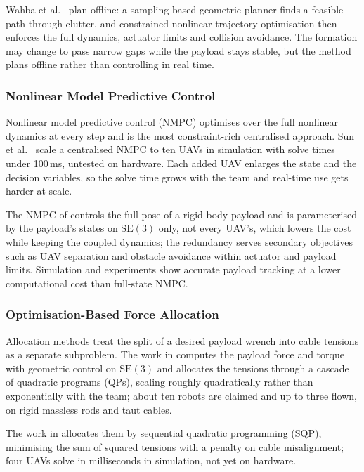 Wahba et al.\ \cite{wahbaKinodynamicMotionPlanning2024} plan offline: a sampling-based geometric planner finds a feasible path through clutter, and constrained nonlinear trajectory optimisation then enforces the full dynamics, actuator limits and collision avoidance. The formation may change to pass narrow gaps while the payload stays stable, but the method plans offline rather than controlling in real time.

\subsubsection{Nonlinear Model Predictive Control}

Nonlinear model predictive control (NMPC) optimises over the full nonlinear dynamics at every step and is the most constraint-rich centralised approach. Sun et al.\ \cite{sunNonlinearMPCFullPose2023} scale a centralised NMPC to ten UAVs in simulation with solve times under 100\,ms, untested on hardware. Each added UAV enlarges the state and the decision variables, so the solve time grows with the team and real-time use gets harder at scale.

The NMPC of \cite{liNonlinearModelPredictive2023} controls the full pose of a rigid-body payload and is parameterised by the payload's states on $\mathrm{SE}(3)$ only, not every UAV's, which lowers the cost while keeping the coupled dynamics; the redundancy serves secondary objectives such as UAV separation and obstacle avoidance within actuator and payload limits. Simulation and experiments show accurate payload tracking at a lower computational cost than full-state NMPC.

\subsubsection{Optimisation-Based Force Allocation}

Allocation methods treat the split of a desired payload wrench into cable tensions as a separate subproblem. The work in \cite{efficient} computes the payload force and torque with geometric control on $\text{SE}(3)$ and allocates the tensions through a cascade of quadratic programs (QPs), scaling roughly quadratically rather than exponentially with the team; about ten robots are claimed and up to three flown, on rigid massless rods and taut cables.

The work in \cite{vazquez-soquiSQPBasedCableTensionAllocation2026} allocates them by sequential quadratic programming (SQP), minimising the sum of squared tensions with a penalty on cable misalignment; four UAVs solve in milliseconds in simulation, not yet on hardware.

